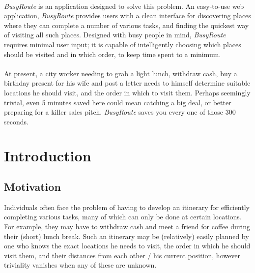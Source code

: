 \documentclass[a4paper, 10pt]{report}
\begin{document}
\\
\textit{BusyRoute} is an application designed to solve this problem. An easy-to-use web application, \textit{BusyRoute} provides users with a clean interface for discovering places where they can complete a number of various tasks, and finding the quickest way of visiting all such places. Designed with busy people in mind, \textit{BusyRoute} requires minimal user input; it is capable of intelligently choosing which places should be visited and in which order, to keep time spent to a minimum.\\
\\
At present, a city worker needing to grab a light lunch, withdraw cash, buy a birthday present for his wife and post a letter needs to himself determine suitable locations he should visit, and the order in which to visit them. Perhaps seemingly trivial, even 5 minutes saved here could mean catching a big deal, or better preparing for a killer sales pitch. \textit{BusyRoute} saves you every one of those 300 seconds.


\chapter{Introduction}
\section{Motivation}
Individuals often face the problem of having to develop an itinerary for efficiently completing various tasks, many of which can only be done at certain locations. For example, they may have to withdraw cash and meet a friend for coffee during their (short) lunch break. Such an itinerary may be (relatively) easily planned by one who knows the exact locations he needs to visit, the order in which he should visit them, and their distances from each other / his current position, however triviality vanishes when any of these are unknown.
\end{document}

